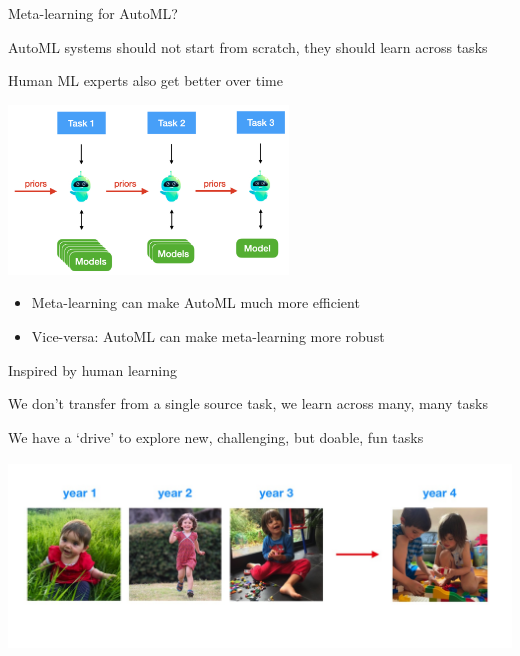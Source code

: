 \begin{frame}{Meta-learning for AutoML?}
  \centerline{AutoML systems should not start from scratch, they should learn across tasks}
  \centerline{Human ML experts also get better over time}

  \centering\includegraphics[height=4.5cm]{image/imgnew1.png}
  
  \begin{itemize}
    \item Meta-learning can make AutoML much more efficient
    \item Vice-versa: AutoML can make meta-learning more robust
  \end{itemize}

\end{frame}

\begin{frame}{Inspired by human learning}
\centerline{We don’t transfer from a single source task, we learn across many, many tasks}
\centerline{We have a ‘drive’ to explore new, challenging, but doable, fun tasks}
 
\centering\includegraphics[height=5cm]{image/img184210.jpg}

\end{frame}

